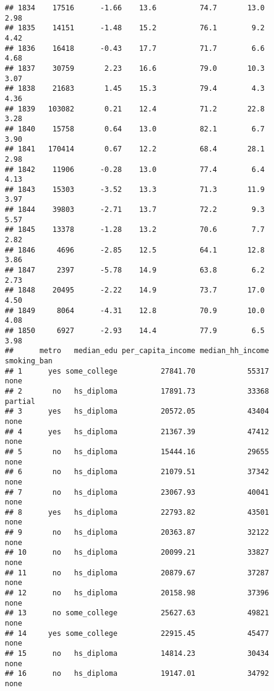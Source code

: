 \documentclass[
]{article}
\begin{document}
\begin{verbatim}
## 1834    17516      -1.66    13.6          74.7       13.0              2.98
## 1835    14151      -1.48    15.2          76.1        9.2              4.42
## 1836    16418      -0.43    17.7          71.7        6.6              4.68
## 1837    30759       2.23    16.6          79.0       10.3              3.07
## 1838    21683       1.45    15.3          79.4        4.3              4.36
## 1839   103082       0.21    12.4          71.2       22.8              3.28
## 1840    15758       0.64    13.0          82.1        6.7              3.90
## 1841   170414       0.67    12.2          68.4       28.1              2.98
## 1842    11906      -0.28    13.0          77.4        6.4              4.13
## 1843    15303      -3.52    13.3          71.3       11.9              3.97
## 1844    39803      -2.71    13.7          72.2        9.3              5.57
## 1845    13378      -1.28    13.2          70.6        7.7              2.82
## 1846     4696      -2.85    12.5          64.1       12.8              3.86
## 1847     2397      -5.78    14.9          63.8        6.2              2.73
## 1848    20495      -2.22    14.9          73.7       17.0              4.50
## 1849     8064      -4.31    12.8          70.9       10.0              4.08
## 1850     6927      -2.93    14.4          77.9        6.5              3.98
##      metro   median_edu per_capita_income median_hh_income smoking_ban
## 1      yes some_college          27841.70            55317        none
## 2       no   hs_diploma          17891.73            33368     partial
## 3      yes   hs_diploma          20572.05            43404        none
## 4      yes   hs_diploma          21367.39            47412        none
## 5       no   hs_diploma          15444.16            29655        none
## 6       no   hs_diploma          21079.51            37342        none
## 7       no   hs_diploma          23067.93            40041        none
## 8      yes   hs_diploma          22793.82            43501        none
## 9       no   hs_diploma          20363.87            32122        none
## 10      no   hs_diploma          20099.21            33827        none
## 11      no   hs_diploma          20879.67            37287        none
## 12      no   hs_diploma          20158.98            37396        none
## 13      no some_college          25627.63            49821        none
## 14     yes some_college          22915.45            45477        none
## 15      no   hs_diploma          14814.23            30434        none
## 16      no   hs_diploma          19147.01            34792        none

\end{verbatim}
\end{document}
